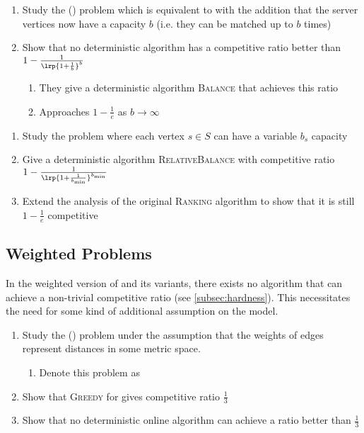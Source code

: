 \begin{enumerate}
    \item Study the \ombmatch{} \textsf{(\ombm{})} problem which is equivalent to \omm{} with the addition that the server vertices now have a capacity $b$ (i.e.\! they can be matched up to $b$ times)
    \item Show that no deterministic algorithm has a competitive ratio better than $1 - \frac{1}{\lrp{1 + \frac{1}{b}}^b}$ 
    \begin{enumerate}
        \item They give a deterministic algorithm \textsc{Balance} that achieves this ratio
        \item Approaches $1 - \frac{1}{e}$ as $b \rightarrow \infty$ 
    \end{enumerate}
\end{enumerate}

\begin{enumerate}
    \item Study the \ombm{} problem where each vertex $s \in S$ can have a variable $b_s$ capacity
    \item Give a deterministic algorithm \textsc{RelativeBalance} with competitive ratio $1 - \frac{1}{\lrp{1 + \frac{1}{b_{\min}}}^{b_{\min}}}$
    \item Extend the analysis of the original \textsc{Ranking} algorithm to show that it is still $1 - \frac{1}{e}$ competitive 
\end{enumerate}

\subsection{Weighted Problems}

In the weighted version of \omm{} and its \bmatch{} variants, there exists no algorithm that 
can achieve a non-trivial competitive ratio (see \cref{subsec:hardness}). This necessitates the need 
for some kind of additional assumption on the model. 

\begin{enumerate}
    \item Study the \omwmatch{} \textsf{(\omwm{})} problem under the assumption that the weights of edges represent distances in some metric space. 
    \begin{enumerate}
        \item Denote this problem as \momwm{}
    \end{enumerate}
    \item Show that \textsc{Greedy} for \momwm{} gives competitive ratio $\frac{1}{3}$ 
    \item Show that no deterministic online algorithm can achieve a ratio better than $\frac{1}{3}$ 
\end{enumerate}

